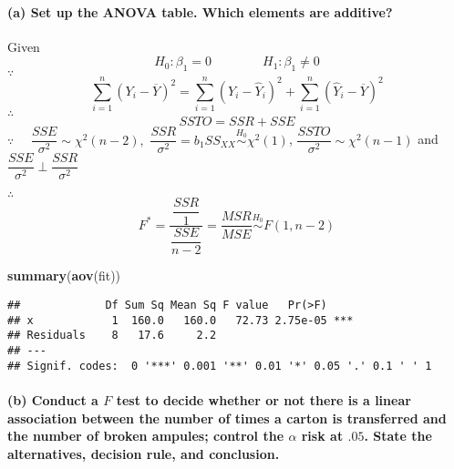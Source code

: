 \documentclass[]{article}
\newenvironment{Shaded}{\begin{snugshade}}{\end{snugshade}}
\newcommand{\KeywordTok}[1]{\textcolor[rgb]{0.13,0.29,0.53}{\textbf{#1}}}
\newcommand{\NormalTok}[1]{#1}
\let\oldparagraph\paragraph
\renewcommand{\paragraph}[1]{\oldparagraph{#1}\mbox{}}
\begin{document}
\paragraph{(a) Set up the ANOVA table. Which elements are
additive?}\label{a-set-up-the-anova-table.-which-elements-are-additive}

Given \[H_0:\beta_1=0\qquad\qquad H_1:\beta_1\neq 0\] \(\because\quad\)
\[\sum\limits_{i=1}^n(Y_i-\overline{Y})^2=\sum\limits_{i=1}^n(Y_i-\hat{Y}_i)^2+\sum\limits_{i=1}^n(\hat{Y}_i-\overline{Y})^2\]
\(\therefore\quad\) \[SSTO=SSR+SSE\] \(\because\quad\)
\(\dfrac{SSE}{\sigma^2}\sim\chi^2(n-2),\)
\(\dfrac{SSR}{\sigma^2}=b_1SS_{XX}\overset{H_0}{\sim}\chi^2(1)\),
\(\dfrac{SSTO}{\sigma^2}\sim\chi^2(n-1)\) and
\(\dfrac{SSE}{\sigma^2}\perp\dfrac{SSR}{\sigma^2}\)

\(\therefore\quad\)
\[F^*=\dfrac{\ \dfrac{SSR}{1}\ }{\dfrac{SSE}{n-2}}=\dfrac{MSR}{MSE}\overset{H_0}{\sim}F(1,n-2)\]

\begin{Shaded}
\begin{Highlighting}[]
\KeywordTok{summary}\NormalTok{(}\KeywordTok{aov}\NormalTok{(fit))}
\end{Highlighting}
\end{Shaded}

\begin{verbatim}
##             Df Sum Sq Mean Sq F value   Pr(>F)    
## x            1  160.0   160.0   72.73 2.75e-05 ***
## Residuals    8   17.6     2.2                     
## ---
## Signif. codes:  0 '***' 0.001 '**' 0.01 '*' 0.05 '.' 0.1 ' ' 1
\end{verbatim}

\paragraph{\texorpdfstring{(b) Conduct a \(F\) test to decide whether or
not there is a linear association between the number of times a carton
is transferred and the number of broken ampules; control the \(\alpha\)
risk at \(.05\). State the alternatives, decision rule, and
conclusion.}{(b) Conduct a F test to decide whether or not there is a linear association between the number of times a carton is transferred and the number of broken ampules; control the \textbackslash{}alpha risk at .05. State the alternatives, decision rule, and conclusion.}}\label{b-conduct-a-f-test-to-decide-whether-or-not-there-is-a-linear-association-between-the-number-of-times-a-carton-is-transferred-and-the-number-of-broken-ampules-control-the-alpha-risk-at-.05.-state-the-alternatives-decision-rule-and-conclusion.}
\end{document}
